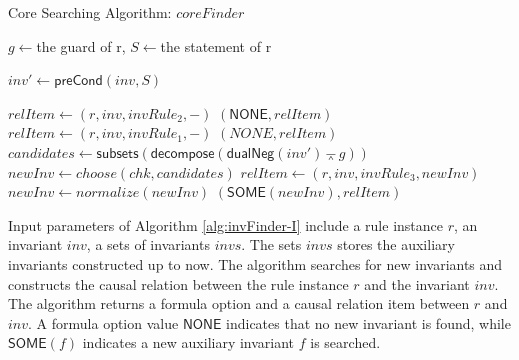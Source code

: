 \documentclass[final]{IEEEtran}
\def \andc {\barwedge }
\begin{document}
\begin{algorithm}

\caption{Core Searching Algorithm: $coreFinder$}\label{alg:invfinderI}



{
    $g\leftarrow $the guard of r, $S\leftarrow $the statement of r\;

    $inv'\leftarrow \mathsf{preCond}(inv, S)$\; \label{line:preCondComp}

    {
    $relItem\leftarrow (r, inv, invRule_2,-)$\;
    \Return $(\mathsf{NONE},  relItem )$\;
    }
    {
    $relItem\leftarrow (r, inv, invRule_1,-)$\;
    \Return $(NONE,  relItem )$\;
    }
    \Else
    {
    $candidates\leftarrow \mathsf{subsets}(\mathsf{decompose}(\mathsf{dualNeg}(inv')\andc g))$\;
    $newInv\leftarrow choose(chk,candidates)$\;
    $relItem\leftarrow (r, inv, invRule_3,newInv)$\;
    {
    $newInv \leftarrow  normalize(newInv)$\;%
    \Return $(\mathsf{SOME}(newInv),   relItem )$\;
    }
    }
}


\end{algorithm}



Input parameters of Algorithm \ref{alg:invFinder-I} include a rule instance $r$, an invariant $inv$, a sets of invariants $invs$.  The sets $invs$   stores the auxiliary invariants constructed up to now. The algorithm   searches for new invariants and    constructs the causal relation between the rule instance $r$ and the invariant $inv$.
The algorithm returns a formula option and a causal relation item between $r$ and $inv$. A formula option value $\mathsf{NONE}$ indicates that no new invariant is found, while $\mathsf{SOME}(f)$ indicates a new auxiliary invariant $f$ is searched.


%
\end{document}
